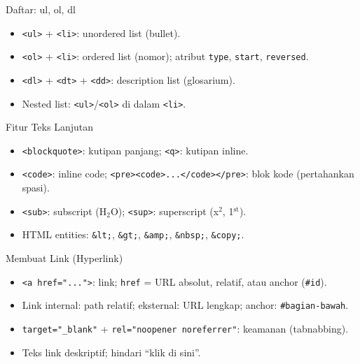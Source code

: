 \documentclass[handout]{beamer}
\begin{document}
\begin{frame}{Daftar: ul, ol, dl}
	\begin{itemize}
		\item \texttt{<ul>} + \texttt{<li>}: unordered list (bullet).
		\item \texttt{<ol>} + \texttt{<li>}: ordered list (nomor); atribut \texttt{type}, \texttt{start}, \texttt{reversed}.
		\item \texttt{<dl>} + \texttt{<dt>} + \texttt{<dd>}: description list (glosarium).
		\item Nested list: \texttt{<ul>}/\texttt{<ol>} di dalam \texttt{<li>}.
	\end{itemize}
\end{frame}

\begin{frame}{Fitur Teks Lanjutan}
	\begin{itemize}
		\item \texttt{<blockquote>}: kutipan panjang; \texttt{<q>}: kutipan inline.
		\item \texttt{<code>}: inline code; \texttt{<pre><code>...</code></pre>}: blok kode (pertahankan spasi).
		\item \texttt{<sub>}: subscript (H$_2$O); \texttt{<sup>}: superscript (x$^2$, 1$^\mathrm{st}$).
		\item HTML entities: \texttt{\&lt;}, \texttt{\&gt;}, \texttt{\&amp;}, \texttt{\&nbsp;}, \texttt{\&copy;}.
	\end{itemize}
\end{frame}

\begin{frame}{Membuat Link (Hyperlink)}
	\begin{itemize}
		\item \texttt{<a href="...">}: link; \texttt{href} = URL absolut, relatif, atau anchor (\texttt{\#id}).
		\item Link internal: path relatif; eksternal: URL lengkap; anchor: \texttt{\#bagian-bawah}.
		\item \texttt{target="\_blank"} + \texttt{rel="noopener noreferrer"}: keamanan (tabnabbing).
		\item Teks link deskriptif; hindari ``klik di sini''.
	\end{itemize}
\end{frame}
\end{document}

